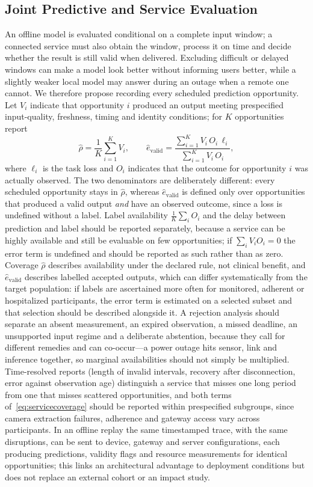 \documentclass[journal]{IEEEtran}
\begin{document}
\subsection{Joint Predictive and Service Evaluation}
\label{sec:jointservice}
An offline model is evaluated conditional on a complete input window; a connected service must also obtain the window, process it on time and decide whether the result is still valid when delivered. Excluding difficult or delayed windows can make a model look better without informing users better, while a slightly weaker local model may answer during an outage when a remote one cannot. We therefore propose recording every scheduled prediction opportunity. Let $V_i$ indicate that opportunity $i$ produced an output meeting prespecified input-quality, freshness, timing and identity conditions; for $K$ opportunities report
\begin{equation}
\widehat{\rho}=\frac{1}{K}\sum_{i=1}^{K}V_i,\qquad
\widehat{e}_{\mathrm{valid}}=
\frac{\sum_{i=1}^{K}V_i\,O_i\,\ell_i}{\sum_{i=1}^{K}V_i\,O_i},
\label{eq:servicecoverage}
\end{equation}
where $\ell_i$ is the task loss and $O_i$ indicates that the outcome for opportunity $i$ was actually observed. The two denominators are deliberately different: every scheduled opportunity stays in $\widehat{\rho}$, whereas $\widehat{e}_{\mathrm{valid}}$ is defined only over opportunities that produced a valid output \emph{and} have an observed outcome, since a loss is undefined without a label. Label availability $\frac{1}{K}\sum_i O_i$ and the delay between prediction and label should be reported separately, because a service can be highly available and still be evaluable on few opportunities; if $\sum_i V_iO_i=0$ the error term is undefined and should be reported as such rather than as zero. Coverage $\widehat{\rho}$ describes availability under the declared rule, not clinical benefit, and $\widehat{e}_{\mathrm{valid}}$ describes labelled accepted outputs, which can differ systematically from the target population: if labels are ascertained more often for monitored, adherent or hospitalized participants, the error term is estimated on a selected subset and that selection should be described alongside it. A rejection analysis should separate an absent measurement, an expired observation, a missed deadline, an unsupported input regime and a deliberate abstention, because they call for different remedies and can co-occur---a power outage hits sensor, link and inference together, so marginal availabilities should not simply be multiplied. Time-resolved reports (length of invalid intervals, recovery after disconnection, error against observation age) distinguish a service that misses one long period from one that misses scattered opportunities, and both terms of~\eqref{eq:servicecoverage} should be reported within prespecified subgroups, since camera extraction failures, adherence and gateway access vary across participants. In an offline replay the same timestamped trace, with the same disruptions, can be sent to device, gateway and server configurations, each producing predictions, validity flags and resource measurements for identical opportunities; this links an architectural advantage to deployment conditions but does not replace an external cohort or an impact study.
\end{document}
